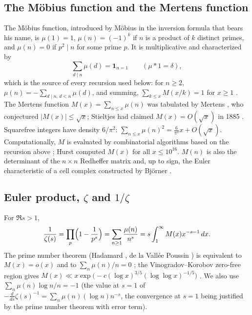 \documentclass[11pt,reqno]{amsart}
\numberwithin{equation}{section}
\theoremstyle{plain}
\theoremstyle{definition}
\theoremstyle{remark}
\begin{document}
\subsection{The Möbius function and the Mertens function}
\label{subsec:intro-mobius}
The Möbius function, introduced by Möbius \cite{Mobius1832} in the
inversion formula that bears his name, is $\mu(1)=1$, $\mu(n)=(-1)^k$ if $n$
is a product of $k$ distinct primes, and $\mu(n)=0$ if $p^2\mid n$ for some
prime $p$. It is multiplicative and characterized by
\begin{equation}
\sum_{d\mid n}\mu(d)=\mathbf 1_{n=1}\qquad(\mu*1=\delta),
\end{equation}
which is the source of every recursion used below: for $n\ge2$,
$\mu(n)=-\sum_{d\mid n,\,d<n}\mu(d)$, and summing,
$\sum_{k\le x}M(x/k)=1$ for $x\ge1$ \cite[\S3.2]{MontgomeryVaughan2007}.
The Mertens function $M(x)=\sum_{n\le x}\mu(n)$ was tabulated by Mertens
\cite{Mertens1897}, who conjectured $|M(x)|\le\sqrt x$; Stieltjes had
claimed $M(x)=O(\sqrt x)$ in 1885 \cite{Stieltjes1905}. Squarefree integers
have density $6/\pi^2$: $\sum_{n\le x}\mu(n)^2=\frac6{\pi^2}x+O(\sqrt x)$.
Computationally, $M$ is evaluated by combinatorial algorithms based on the
recursion above \cite{DelegliseRivat1996,HT23}; Hurst \cite{Hurst18}
computed $M(x)$ for all $x\le10^{16}$. $M(n)$ is also the determinant of the
$n\times n$ Redheffer matrix \cite{Redheffer1977} and, up to sign, the
Euler characteristic of a cell complex constructed by Björner
\cite{Bjorner2011}.

\subsection{\texorpdfstring{Euler product, $\zeta$ and $1/\zeta$}{Euler product, zeta and 1/zeta}}
For $\Re s>1$,
\begin{equation}
\frac1{\zeta(s)}=\prod_p\Bigl(1-\frac1{p^s}\Bigr)=\sum_{n\ge1}\frac{\mu(n)}{n^s}
=s\int_1^\infty M(x)x^{-s-1}\,dx .
\end{equation}
The prime number theorem (Hadamard \cite{Hadamard1896}, de la Vallée
Poussin \cite{dlVP1896}) is equivalent to $M(x)=o(x)$ \cite{Landau1911}
and to $\sum_{n}\mu(n)/n=0$ \cite{vonMangoldt1897}; the Vinogradov--Korobov
zero-free region gives
$M(x)\ll x\exp\bigl(-c(\log x)^{3/5}(\log\log x)^{-1/5}\bigr)$
\cite{Walfisz1963,Ford2002}. We also use
$\sum_n\mu(n)\log n/n=-1$ (the value at $s=1$ of
$-\frac{d}{ds}\zeta(s)^{-1}=\sum_n\mu(n)(\log n)n^{-s}$, the convergence at $s=1$
being justified by the prime number theorem with error term).
\end{document}

